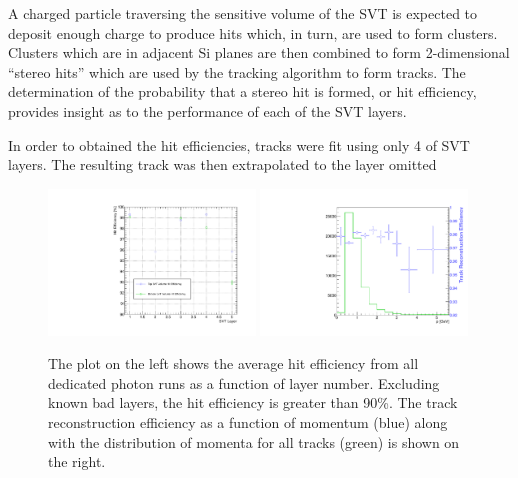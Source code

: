
%
%
 
A charged particle traversing the sensitive volume of the SVT is expected to
deposit enough charge to produce hits which, in turn, are used to form 
clusters. Clusters which are in adjacent Si planes are then combined to form
2-dimensional ``stereo hits'' which are used by the tracking algorithm to 
form tracks.  The determination of the probability that a stereo hit is 
formed, or hit efficiency, provides insight as to the performance of each of 
the SVT layers.

In order to obtained the hit efficiencies, tracks were fit using only 4 of 
SVT layers. The resulting track was then extrapolated to the layer omitted
\begin{figure}[h]
    \begin{center}
    	\includegraphics[width=0.49\textwidth]{test2012/svtperformance/trk_performance/hit_efficiency_vs_layer.pdf}
    	\includegraphics[width=0.49\textwidth]{test2012/svtperformance/trk_performance/track_reco_efficiency.pdf}
        \caption{
                    The plot on the left shows the average hit efficiency
                    from all dedicated photon runs as a function of layer
                    number.  Excluding known bad layers, the hit efficiency
                    is greater than 90\%. The track reconstruction efficiency
                    as a function of momentum (blue) along with the 
                    distribution of momenta for all tracks (green) is shown
                    on the right.
                } 
	\label{fig:hit_track_efficiency}
    \end{center}
\end{figure}
